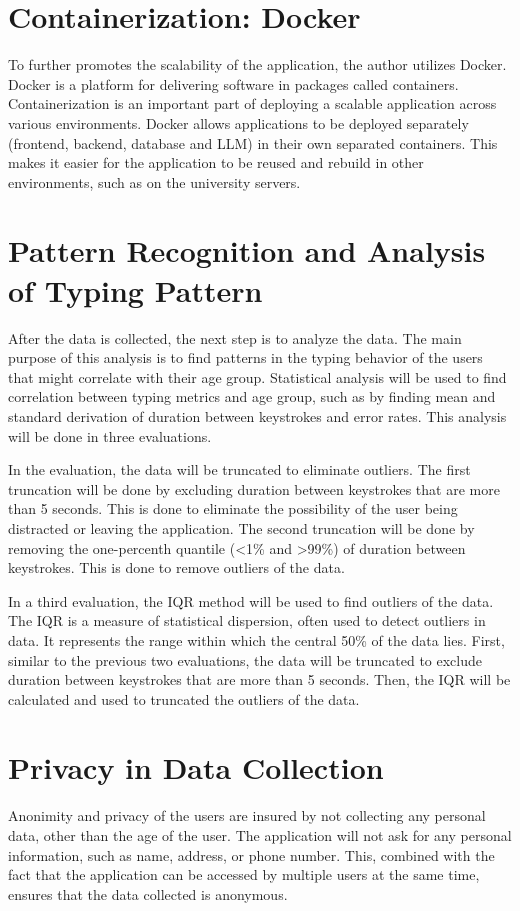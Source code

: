 \section{Containerization: Docker}
To further promotes the scalability of the application, the author utilizes Docker.
Docker is a platform for delivering software in packages called containers.
Containerization is an important part of deploying a scalable application across various environments.
Docker allows applications to be deployed separately (frontend, backend, database and \ac{LLM}) in their own separated containers.
This makes it easier for the application to be reused and rebuild in other environments, such as on the university servers.

\section{Pattern Recognition and Analysis of Typing Pattern}

After the data is collected, the next step is to analyze the data.
The main purpose of this analysis is to find patterns in the typing behavior of the users that might correlate with their age group.
Statistical analysis will be used to find correlation between typing metrics and age group, such as by finding mean and standard derivation of duration between keystrokes and error rates.
This analysis will be done in three evaluations.

In the evaluation, the data will be truncated to eliminate outliers.
The first truncation will be done by excluding duration between keystrokes that are more than 5 seconds.
This is done to eliminate the possibility of the user being distracted or leaving the application.
The second truncation will be done by removing the one-percenth quantile (\textless1\% and \textgreater99\%) of duration between keystrokes.
This is done to remove outliers of the data.

In a third evaluation, the \ac{IQR} method will be used to find outliers of the data.
The \ac{IQR} is a measure of statistical dispersion, often used to detect outliers in data. 
It represents the range within which the central 50\% of the data lies.
First, similar to the previous two evaluations, the data will be truncated to exclude duration between keystrokes that are more than 5 seconds.
Then, the \ac{IQR} will be calculated and used to truncated the outliers of the data.

\section{Privacy in Data Collection}

Anonimity and privacy of the users are insured by not collecting any personal data, other than the age of the user.
The application will not ask for any personal information, such as name, address, or phone number.
This, combined with the fact that the application can be accessed by multiple users at the same time, ensures that the data collected is anonymous.
